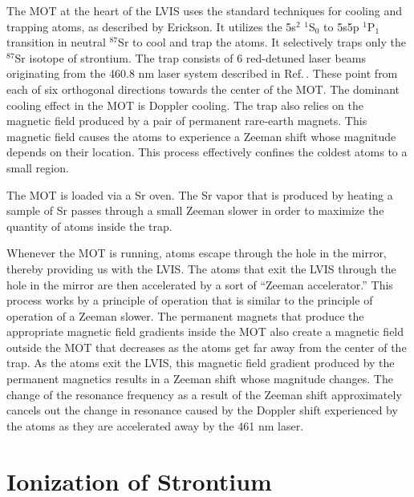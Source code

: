 The MOT at the heart of the LVIS uses the standard techniques for cooling and trapping atoms, as described by Erickson\cite{cjeDiss}. It utilizes the 5s$^2$ $^1$S$_0$ to 5s5p $^1$P$_1$ transition in neutral $^{87}$Sr to cool and trap the atoms. It selectively traps only the $^{87}$Sr isotope of strontium. The trap consists of 6 red-detuned laser beams originating from the 460.8 nm laser system described in Ref.\,\cite{cjeDiss}. These point from each of six orthogonal directions towards the center of the MOT. The dominant cooling effect in the MOT is Doppler cooling. 
The trap also relies on the magnetic field produced by a pair of permanent rare-earth magnets. This magnetic field causes the atoms to experience a Zeeman shift whose magnitude depends on their location. This process effectively confines the coldest atoms to a small region. 

The MOT is loaded via a Sr oven. The Sr vapor that is produced by heating a sample of Sr passes through a small Zeeman slower in order to maximize the quantity of atoms inside the trap. 



Whenever the MOT is running, atoms escape through the hole in the mirror, thereby providing us with the LVIS. The atoms that exit the LVIS through the hole in the mirror are then accelerated by a sort of ``Zeeman accelerator.'' This process works by a principle of operation that is similar to the principle of operation of a Zeeman slower. The permanent magnets that produce the appropriate magnetic field gradients inside the MOT also create a magnetic field outside the MOT that decreases as the atoms get far away from the center of the trap. As the atoms exit the LVIS, this magnetic field gradient produced by the permanent magnetics results in a Zeeman shift whose magnitude changes. The change of the resonance frequency as a result of the Zeeman shift approximately cancels out the change in resonance caused by the Doppler shift experienced by the atoms as they are accelerated away by the 461 nm laser. 

\section{Ionization of Strontium}
 
